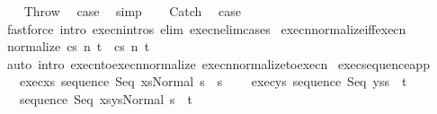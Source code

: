 \begin{isabellebody}
\isamarkupfalse%
\isanewline
\ \ \isamarkupfalse%
\ Throw\ \isamarkupfalse%
\ {\isacharquery}case\ \isamarkupfalse%
\ simp\isanewline
{}\isamarkupfalse%
\isanewline
\ \ \isamarkupfalse%
\ Catch\ \isamarkupfalse%
\ {\isacharquery}case\ \isamarkupfalse%
\ {\isacharparenleft}fastforce\ intro{\isacharcolon}\ execn{\isachardot}intros\ elim{\isacharbang}{\isacharcolon}\ execn{\isacharunderscore}elim{\isacharunderscore}cases{\isacharparenright}\isanewline
{}\isamarkupfalse%
%
\endisatagproof
{\isafoldproof}%
%
\isadelimproof
\isanewline
%
\endisadelimproof
\isanewline
{}\isamarkupfalse%
\ execn{\isacharunderscore}normalize{\isacharunderscore}iff{\isacharunderscore}execn{\isacharcolon}\isanewline
\ {\isachardoublequoteopen}{\isasymGamma}{\isasymturnstile}{\isasymlangle}normalize\ c{\isacharcomma}s{\isasymrangle}\ {\isacharequal}n{\isasymRightarrow}\ t\ {\isacharequal}\ {\isasymGamma}{\isasymturnstile}{\isasymlangle}c{\isacharcomma}s{\isasymrangle}\ {\isacharequal}n{\isasymRightarrow}\ t{\isachardoublequoteclose}\ \isanewline
%
\isadelimproof
\ \ %
\endisadelimproof
%
\isatagproof
{}\isamarkupfalse%
\ {\isacharparenleft}auto\ intro{\isacharcolon}\ execn{\isacharunderscore}to{\isacharunderscore}execn{\isacharunderscore}normalize\ execn{\isacharunderscore}normalize{\isacharunderscore}to{\isacharunderscore}execn{\isacharparenright}%
\endisatagproof
{\isafoldproof}%
%
\isadelimproof
\isanewline
%
\endisadelimproof
\isanewline
{}\isamarkupfalse%
\ exec{\isacharunderscore}sequence{\isacharunderscore}app{\isacharcolon}\ \isanewline
\ \ \ exec{\isacharunderscore}xs{\isacharcolon}\ {\isachardoublequoteopen}{\isasymGamma}{\isasymturnstile}{\isasymlangle}sequence\ Seq\ xs{\isacharcomma}Normal\ s{\isasymrangle}\ {\isasymRightarrow}\ s{\isacharprime}{\isachardoublequoteclose}\ \isanewline
\ \ \ exec{\isacharunderscore}ys{\isacharcolon}\ {\isachardoublequoteopen}{\isasymGamma}{\isasymturnstile}{\isasymlangle}sequence\ Seq\ ys{\isacharcomma}s{\isacharprime}{\isasymrangle}\ {\isasymRightarrow}\ t{\isachardoublequoteclose}\isanewline
\ \ \ {\isachardoublequoteopen}{\isasymGamma}{\isasymturnstile}{\isasymlangle}sequence\ Seq\ {\isacharparenleft}xs{\isacharat}ys{\isacharparenright}{\isacharcomma}Normal\ s{\isasymrangle}\ {\isasymRightarrow}\ t{\isachardoublequoteclose}\isanewline
%
\isadelimproof
%
\endisadelimproof
%
\isatagproof
{}\isamarkupfalse%

\end{isabellebody}
